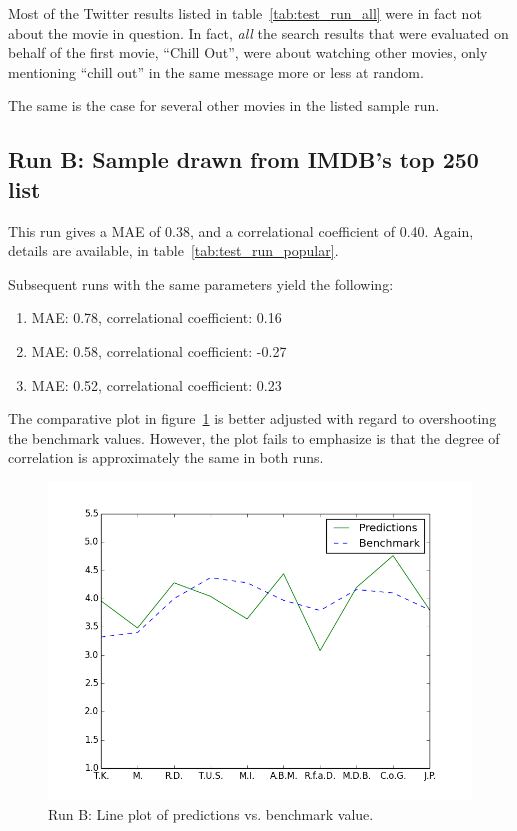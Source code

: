 Most of the Twitter results listed in table~\ref{tab:test_run_all} were in fact not about the movie in question. In fact, \emph{all} the search results that were evaluated on behalf of the first movie, ``Chill Out'', were about watching other movies, only mentioning ``chill out'' in the same message more or less at random.

The same is the case for several other movies in the listed sample run.

\subsection{Run B: Sample drawn from IMDB's top 250 list}

This run gives a MAE of 0.38, and a correlational coefficient of 0.40. Again, details are available, in table~\ref{tab:test_run_popular}.

Subsequent runs with the same parameters yield the following:

\begin{enumerate}
  \item MAE: 0.78, correlational coefficient: 0.16
  \item MAE: 0.58, correlational coefficient: -0.27
  \item MAE: 0.52, correlational coefficient: 0.23
\end{enumerate}

The comparative plot in figure~\ref{fig:predictions_benchmark_pop} is better adjusted with regard to overshooting the benchmark values. However, the plot fails to emphasize is that the degree of correlation is approximately the same in both runs.

\begin{figure}[h]
  \centering
    \includegraphics[width=.8\textwidth]{Figures/plots/predictions_benchmark_pop}
  \caption{Run B: Line plot of predictions vs. benchmark value.}
  \label{fig:predictions_benchmark_pop}
\end{figure}

